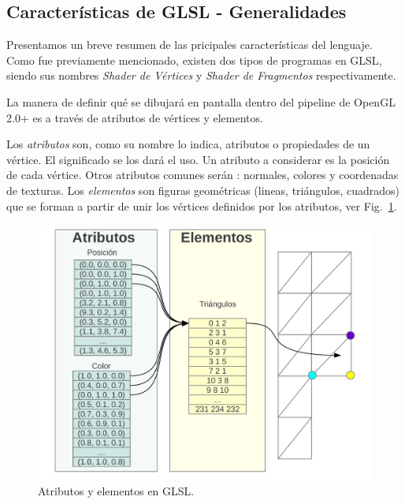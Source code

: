 
\subsection{Caracter\'isticas de GLSL - Generalidades}
Presentamos un breve resumen de las pricipales caracter\'isticas del lenguaje.
Como fue previamente mencionado, existen dos tipos de programas en GLSL, siendo sus nombres {\em Shader de Vértices} y {\em Shader de Fragmentos} respectivamente.

La manera de definir qué se dibujará en pantalla dentro del pipeline de OpenGL 2.0+  es a través de atributos de vértices y elementos. 


Los \emph{atributos} son, como su nombre lo indica, atributos o propiedades de un vértice. El significado se los dará el uso.
Un atributo a considerar es la posición de cada vértice.
Otros atributos comunes serán : normales, colores y coordenadas de texturas.
Los \emph{elementos} son figuras geométricas (lineas, triángulos, cuadrados) que se forman a partir de unir los vértices definidos por los atributos, ver Fig.~\ref{fg:atributos}.

\begin{figure}[h]
\begin{center}
\includegraphics[width=13cm]{figures/atributos}
\end{center}
\caption{Atributos y elementos en GLSL.}
\label{fg:atributos}
\end{figure}

